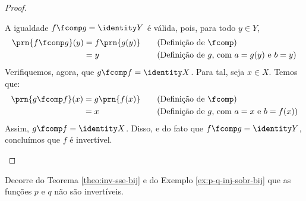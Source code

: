 \begin{proof}
\begin{itemize}
        A igualdade $f \fcomp g = \identity Y$ é válida, pois, para todo $y \in Y$,
        \begin{alignat*}{3}
            \prn{f \fcomp g}(y) & = f\prn{g(y)} && \quad\text{(Definição de $\fcomp$)} \\ 
             &= y && \quad\text{(Definição de $g$, com $a=g(y)$ e $b=y$)}
        \end{alignat*}
        Verifiquemos, agora, que $g \fcomp f = \identity X$.
        Para tal, seja $x \in X$.
        Temos que:
        \begin{alignat*}{3}
            \prn{g \fcomp f}(x) & = g\prn{f(x)} && \quad\text{(Definição de $\fcomp$)} \\ 
             &= x && \quad\text{(Definição de $g$, com $a=x$ e $b=f(x)$)}
        \end{alignat*}
        Assim, $g \fcomp f = \identity X$.
        Disso, e do fato que $f \fcomp g = \identity Y$, concluímos que $f$ é invertível.
    \end{itemize}
\end{proof}

\begin{example}
    Decorre do Teorema \ref{theo:inv-sse-bij} e do Exemplo \ref{ex:p-q-inj-sobr-bij} que as funções $p$ e $q$ não são invertíveis.
\end{example}